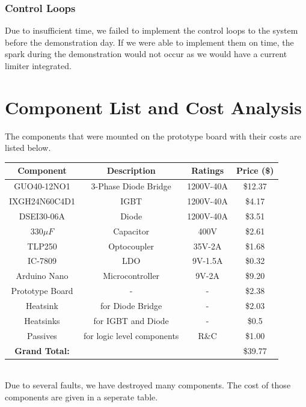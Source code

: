 \documentclass[12pt]{article}
\begin{document}
\subsubsection{Control Loops}
Due to insufficient time, we failed to implement the control loops to the system before the demonstration day. If we were able to implement them on time, the spark during the demonstration would not occur as we would have a current limiter integrated.
\section{Component List and Cost Analysis}
The components that were mounted on the prototype board with their costs are listed below. \\
\begin{tabular}{|c|c|c|c|}
    \hline
    \textbf{Component} & \textbf{\textbf{Description}} & \textbf{Ratings} & \textbf{Price (\$)} \\ \hline
    GUO40-12NO1 & 3-Phase Diode Bridge & 1200V-40A & \$12.37 \\ \hline
    IXGH24N60C4D1 & IGBT & 1200V-40A & \$4.17 \\ \hline
    DSEI30-06A & Diode & 1200V-40A & \$3.51 \\ \hline
    \begin{math} 330 \mu F \end{math} & Capacitor & 400V & \$2.61 \\ \hline
    TLP250 & Optocoupler & 35V-2A & \$1.68 \\ \hline
    IC-7809 & LDO & 9V-1.5A & \$0.32\\ \hline
    Arduino Nano & Microcontroller & 9V-2A & \$9.20 \\ \hline
    Prototype Board & - & - & \$2.38 \\ \hline
    Heatsink & for Diode Bridge & - & \$2.03 \\ \hline
    Heatsinks & for IGBT and Diode & - & \$0.5 \\ \hline
    Passives & for logic level components & R\&C & \$1.00 \\ \hline
    \textbf{Grand Total:} & & & \$39.77 \\ \hline
\end{tabular} \bigskip \\
Due to several faults, we have destroyed many components. The cost of those components are given in a seperate table.
\end{document}

